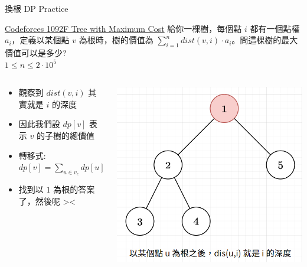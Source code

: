 \documentclass[aspectratio=169]{beamer}
\begin{document}
    \begin{frame}{換根 DP Practice}
        \begin{block}{\href{https://codeforces.com/contest/1092/problem/F}{Codeforces 1092F Tree with Maximum Cost}}
        給你一棵樹，每個點 $i$ 都有一個點權 $a_i$，定義以某個點 $v$ 為根時，樹的價值為 $\sum_{i=1}^n dist(v,i) \cdot a_i$。問這棵樹的最大價值可以是多少? \\
        \vspace{5mm}
        $1 \le n \le 2 \cdot 10^5$
        \end{block}
        \begin{columns}
            \begin{column}{0.6\textwidth}
                \begin{itemize}
                    \item 觀察到 $dist(v,i)$ 其實就是 $i$ 的深度
                    \item 因此我們設 $dp[v]$ 表示 $v$ 的子樹的總價值
                    \item 轉移式: $dp[v] = \sum_{u \in v_c} dp[u] + \texttt{dep}[v] \cdot a_i$
                    \item<2-> 找到以 $1$ 為根的答案了，然後呢 ><
                \end{itemize}
            \end{column}
            \begin{column}{0.4\textwidth}
                \begin{center}
                    \includegraphics[scale=0.25]{images/cf1072f.png}
                \end{center}
            \end{column}
        \end{columns}
    \end{frame}
    
\end{document}
